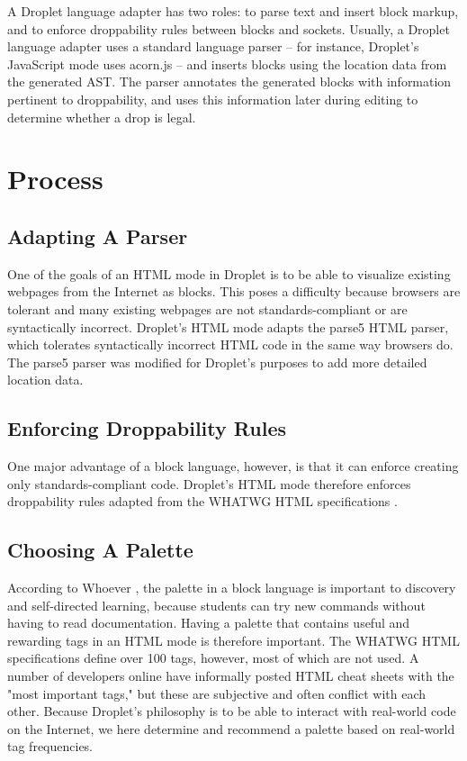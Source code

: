 \documentclass[conference]{IEEEtran}
\begin{document}
A Droplet language adapter has two roles: to parse text and insert block markup, and to enforce droppability rules between blocks and sockets. Usually, a Droplet language adapter uses a standard language parser -- for instance, Droplet's JavaScript mode uses acorn.js -- and inserts blocks using the location data from the generated AST. The parser annotates the generated blocks with information pertinent to droppability, and uses this information later during editing to determine whether a drop is legal.

\section{Process}

\subsection{Adapting A Parser}
One of the goals of an HTML mode in Droplet is to be able to visualize existing webpages from the Internet as blocks. This poses a difficulty because browsers are tolerant and many existing webpages are not standards-compliant or are syntactically incorrect. Droplet's HTML mode adapts the parse5 \cite{parse5} HTML parser, which tolerates syntactically incorrect HTML code in the same way browsers do. The parse5 parser was modified for Droplet's purposes to add more detailed location data.

\subsection{Enforcing Droppability Rules}
One major advantage of a block language, however, is that it can enforce creating only standards-compliant code. Droplet's HTML mode therefore enforces droppability rules adapted from the WHATWG HTML specifications \cite{WHATWG}.

\subsection{Choosing A Palette}

According to Whoever \cite{Whoever}, the palette in a block language is important to discovery and self-directed learning, because students can try new commands without having to read documentation. Having a palette that contains useful and rewarding tags in an HTML mode is therefore important. The WHATWG HTML specifications define over 100 tags, however, most of which are not used. A number of developers online have informally posted HTML cheat sheets with the "most important tags," \cite{CheatSheet1} \cite{CheatSheet2} \cite{CheatSheet3} but these are subjective and often conflict with each other. Because Droplet's philosophy is to be able to interact with real-world code on the Internet, we here determine and recommend a palette based on real-world tag frequencies.
\end{document}
